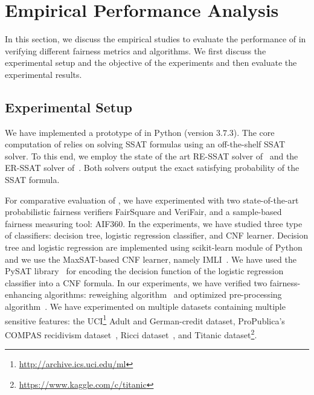 \section{Empirical Performance Analysis}
\label{fairness_justicia_sec:experiments}
In this section, we discuss the empirical studies to evaluate the performance of {\justicia} in verifying different fairness metrics and algorithms. We first discuss the experimental setup and the objective of the experiments and then evaluate the experimental results.
\subsection{Experimental Setup}
We have implemented a prototype of {\justicia} in Python (version $ 3.7.3 $). The core computation of {\justicia} relies on solving SSAT formulas using an off-the-shelf SSAT solver. To this end, we employ the state of the art RE-SSAT solver of~\cite{lee2017solving} and the ER-SSAT solver of~\cite{lee2018solving}. Both solvers output the exact  satisfying probability of the SSAT formula. 

For comparative evaluation of {\justicia}, we have experimented with two state-of-the-art probabilistic fairness verifiers FairSquare and VeriFair, and a sample-based fairness measuring tool: AIF360. In the experiments, we have studied three type of classifiers: decision tree, logistic regression classifier, and CNF learner. Decision tree and logistic regression are implemented using scikit-learn module of Python~\cite{PVGMTGB2011} and we use the MaxSAT-based CNF learner, namely IMLI~\cite{GM2019}. We have used the PySAT library~\cite{imms-sat18} for encoding the decision function of the logistic regression classifier into a CNF formula. In our experiments, we have verified two fairness-enhancing algorithms: reweighing algorithm~\cite{kamiran2012data} and optimized pre-processing  algorithm~\cite{calmon2017optimized}. 
We have experimented on multiple datasets containing multiple sensitive features: the UCI\footnote{\url{ http://archive.ics.uci.edu/ml}} Adult and German-credit dataset,  ProPublica’s COMPAS recidivism dataset~\cite{angwin2016machine}, Ricci dataset~\cite{mcginley2010ricci}, and Titanic dataset\footnote{\url{https://www.kaggle.com/c/titanic}}.

